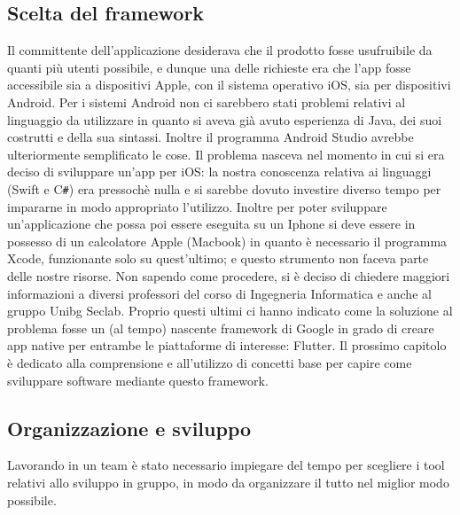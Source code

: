 	\subsection{Scelta del framework}
	Il committente dell'applicazione desiderava che il prodotto fosse 
	usufruibile  da quanti più utenti possibile, e dunque una delle richieste
	era che l'app fosse accessibile sia a dispositivi Apple, con il sistema
	operativo iOS, sia per dispositivi Android. \newline
	Per i sistemi Android non ci sarebbero stati problemi relativi al linguaggio
	da utilizzare in quanto si aveva già avuto esperienza di Java, dei suoi
	costrutti e della sua sintassi. Inoltre il programma Android Studio avrebbe
	ulteriormente semplificato le cose. Il problema nasceva nel momento in cui
	si era deciso di sviluppare un'app per iOS: la nostra conoscenza relativa
	ai
	linguaggi (Swift e C\verb|#|) era pressochè nulla e si sarebbe dovuto
	investire diverso tempo per impararne in modo appropriato l'utilizzo. 
	Inoltre per poter sviluppare un'applicazione che possa poi essere eseguita su un
	Iphone si deve essere in possesso di un calcolatore Apple (Macbook) in
	quanto è necessario il programma Xcode, funzionante solo su quest'ultimo; e
	questo strumento non faceva parte delle nostre risorse.
	Non
	sapendo come procedere, si è deciso di chiedere maggiori informazioni a
	diversi	professori del corso di Ingegneria Informatica e anche al gruppo
	Unibg Seclab. Proprio questi ultimi ci hanno indicato come la soluzione al
	problema fosse un (al tempo) nascente framework di Google in grado di creare
	app native per entrambe le piattaforme di interesse: Flutter. Il prossimo
	capitolo è dedicato alla comprensione e all'utilizzo di concetti base per
	capire come sviluppare software mediante questo framework.
	
	\subsection{Organizzazione e sviluppo}
	Lavorando in un team è stato necessario impiegare del tempo per scegliere i 
	tool relativi allo sviluppo in gruppo, in modo da organizzare il tutto nel 
	miglior modo possibile.


